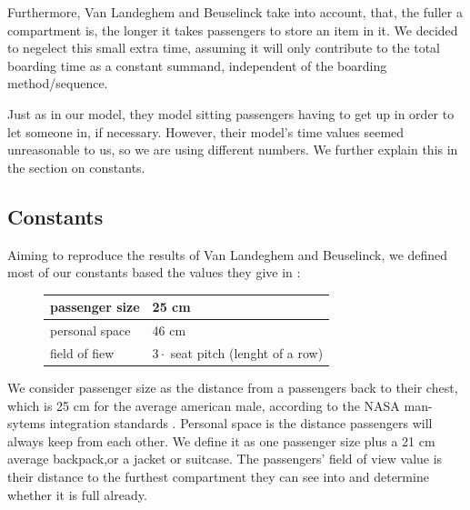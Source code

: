 \documentclass[11pt]{article}
\begin{document}
Furthermore, Van Landeghem and Beuselinck take into account, that, the fuller a compartment is, the longer it takes passengers to store an item in it. We decided to negelect this small extra time, assuming it will only contribute to the total boarding time as a constant summand, independent of the boarding method/sequence.


Just as in our model, they model sitting passengers having to get up in order to let someone in, if necessary. However, their model's  time values seemed unreasonable to us, so we are using different numbers. We further explain this in the section on constants.


\subsection{Constants}
Aiming to reproduce the results of Van Landeghem and Beuselinck, we defined most of our constants based the values they give in \cite{beus}:

\begin{figure}[h!]
	\center
\begin{tabular}{l|l}
	\hline
	passenger size & 25 cm \\
	\hline
	personal space & 46 cm\\
	\hline
	field of fiew & $3 \cdot$ seat pitch (lenght of a row)\\
	\hline
\end{tabular}
\end{figure}
We consider passenger size as the distance from a passengers back to their chest, which is 25 cm for the average american male, according to the NASA man-sytems integration standards \cite{nasa}. Personal space is the distance passengers will always keep from each other. We define it as one passenger size plus a 21 cm average backpack,or a jacket or suitcase.
	The passengers' field of view value is their distance to the furthest compartment they can see into and determine whether it is full already.
\end{document}
